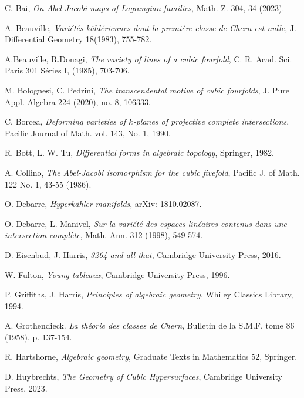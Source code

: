 \documentclass{article}
\theoremstyle{definition}
\begin{document}
\begin{thebibliography}{}

 C. Bai, \emph{On Abel-Jacobi maps of Lagrangian families}, Math. Z. 304, 34 (2023).

 A. Beauville, \emph{Variétés kählériennes dont la première classe de Chern est nulle}, J. Differential Geometry 18(1983),
755-782.

 A.Beauville, R.Donagi, \emph{The variety of lines of a cubic fourfold}, C. R. Acad. Sci. Paris 301 Séries I, (1985), 703-706.

 M. Bolognesi, C. Pedrini, \emph{The transcendental motive of cubic fourfolds}, J. Pure Appl. Algebra 224 (2020), no. 8, 106333.

 C. Borcea, \emph{Deforming varieties of $k$-planes of projective complete intersections}, Pacific Journal of Math. vol. 143, No. 1, 1990.


 R. Bott, L. W. Tu,  \emph{Differential forms in algebraic topology}, Springer, 1982.

 A. Collino, \emph{The Abel-Jacobi isomorphism for the cubic fivefold}, Pacific J. of Math. 122 No. 1, 43-55 (1986).

 O. Debarre, \emph{Hyperkähler manifolds}, arXiv: 1810.02087.

 O. Debarre, L. Manivel, \emph{Sur la variété des espaces linéaires contenus dans une intersection complète}, Math. Ann. 312 (1998), 549-574.

 D. Eisenbud, J. Harris, \emph{3264 and all that}, Cambridge University Press, 2016.

 W. Fulton, \emph{Young tableaux}, Cambridge University Press, 1996.

 P. Griffiths, J. Harris, \emph{Principles of algebraic geometry}, Whiley Classics Library, 1994.

 A. Grothendieck. \emph{La théorie des classes de Chern}, Bulletin de la S.M.F, tome 86
(1958), p. 137-154.

 R. Hartshorne, \emph{Algebraic geometry}, Graduate Texts in Mathematics 52, Springer.

 D. Huybrechts, \emph{The Geometry of Cubic Hypersurfaces}, Cambridge University Press, 2023.


\end{thebibliography}
\end{document}
